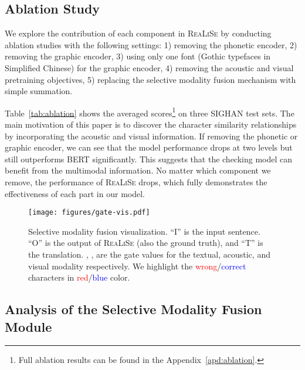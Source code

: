 \documentclass[11pt,a4paper]{article}
\newcommand\model{\textsc{ReaLiSe}}
\begin{document}
\subsection{Ablation Study}

We explore the contribution of each component in \model{} by conducting ablation studies with the following settings: 1) removing the phonetic encoder, 2) removing the graphic encoder, 3) using only one font (Gothic typefaces in Simplified Chinese) for the graphic encoder, 4) removing the acoustic and visual pretraining objectives, 5) replacing the selective modality fusion mechanism with simple summation. 

Table~\ref{tab:ablation} shows the averaged scores\footnote{Full ablation results can be found in the Appendix~\ref{apd:ablation}.} on three SIGHAN test sets. 
The main motivation of this paper is to discover the character similarity relationships by incorporating the acoustic and visual information. If removing the phonetic or graphic encoder, we can see that the model performance drops at two levels but still outperforms BERT significantly. This suggests that the checking model can benefit from the multimodal information.
No matter which component we remove, the performance of \model{} drops, which fully demonstrates the effectiveness of each part in our model. 


\begin{figure}[t]
    \centering
    \texttt{[image: figures/gate-vis.pdf]}
    \caption{Selective modality fusion visualization. ``I'' is the input sentence. ``O'' is the output of \model{} (also the ground truth), and ``T'' is the translation. , ,  are the gate values for the textual, acoustic, and visual modality respectively. We highlight the \textcolor{red}{wrong}/\textcolor{blue}{correct} characters in \textcolor{red}{red}/\textcolor{blue}{blue} color.}
    \label{fig:gate-vis}
\end{figure}


\subsection{Analysis of the Selective Modality Fusion Module}
\end{document}
